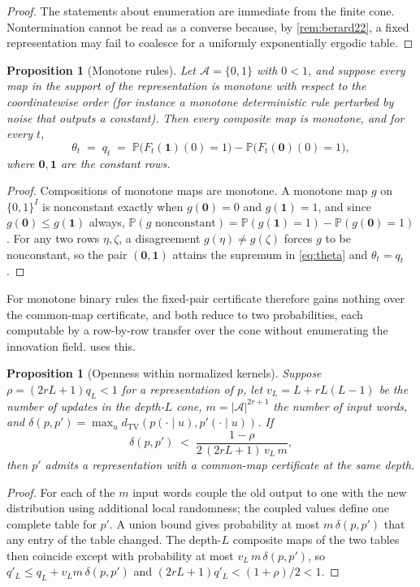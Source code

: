 \documentclass[11pt]{article}
\theoremstyle{plain}
\newtheorem{proposition}[theorem]{Proposition}
\theoremstyle{definition}
\theoremstyle{remark}
\newcommand{\A}{\mathcal{A}}
\newcommand{\Prob}{\mathbb{P}}
\newcommand{\dtv}{d_{\mathrm{TV}}}
\begin{document}
\begin{proof}
The statements about enumeration are immediate from the finite cone. Nontermination cannot be read as a converse because, by \cref{rem:berard22}, a fixed representation may fail to coalesce for a uniformly exponentially ergodic table.
\end{proof}

\begin{proposition}[Monotone rules]
\label{prop:monotone}
Let $\A=\{0,1\}$ with $0<1$, and suppose every map in the support of the representation is monotone with respect to the coordinatewise order (for instance a monotone deterministic rule perturbed by noise that outputs a constant). Then every composite map is monotone, and for every $t$,
\[
\theta_t\;=\;q_t\;=\;\Prob\bigl(F_t(\mathbf 1)(0)=1\bigr)-\Prob\bigl(F_t(\mathbf 0)(0)=1\bigr),
\]
where $\mathbf 0,\mathbf 1$ are the constant rows.
\end{proposition}

\begin{proof}
Compositions of monotone maps are monotone. A monotone map $g$ on $\{0,1\}^I$ is nonconstant exactly when $g(\mathbf 0)=0$ and $g(\mathbf 1)=1$, and since $g(\mathbf 0)\le g(\mathbf 1)$ always, $\Prob(g\text{ nonconstant})=\Prob(g(\mathbf 1)=1)-\Prob(g(\mathbf 0)=1)$. For any two rows $\eta,\zeta$, a disagreement $g(\eta)\neq g(\zeta)$ forces $g$ to be nonconstant, so the pair $(\mathbf 0,\mathbf 1)$ attains the supremum in \eqref{eq:theta} and $\theta_t=q_t$.
\end{proof}

For monotone binary rules the fixed-pair certificate therefore gains nothing over the common-map certificate, and both reduce to two probabilities, each computable by a row-by-row transfer over the cone without enumerating the innovation field.  uses this.

\begin{proposition}[Openness within normalized kernels]
\label{prop:open}
Suppose $\rho=(2rL+1)q_L<1$ for a representation of $p$, let $v_L=L+rL(L-1)$ be the number of updates in the depth-$L$ cone, $m=|\A|^{2r+1}$ the number of input words, and $\delta(p,p')=\max_u\dtv(p(\cdot\mid u),p'(\cdot\mid u))$. If
\[
\delta(p,p')\;<\;\frac{1-\rho}{2\,(2rL+1)\,v_L\,m},
\]
then $p'$ admits a representation with a common-map certificate at the same depth.
\end{proposition}

\begin{proof}
For each of the $m$ input words couple the old output to one with the new distribution using additional local randomness; the coupled values define one complete table for $p'$. A union bound gives probability at most $m\,\delta(p,p')$ that any entry of the table changed. The depth-$L$ composite maps of the two tables then coincide except with probability at most $v_L\,m\,\delta(p,p')$, so $q'_L\le q_L+v_Lm\,\delta(p,p')$ and $(2rL+1)q'_L<(1+\rho)/2<1$.
\end{proof}
\end{document}
